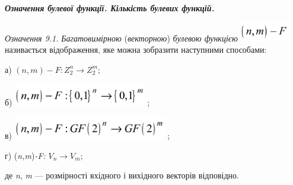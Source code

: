 \bigskip


\bigskip

{\centering\bfseries\itshape
Означення булевої функції.  Кількість булевих функцій. 
\par}


\bigskip


\bigskip

 \textit{Означення 9.1.}\textit{  }\textit{Багатовимірною} (\textit{векторною})
\textit{булевою функцією} 
\includegraphics[width=0.8417in,height=0.3346in]{crypt-img/crypt-img81.png} 
називається відображення, яке можна зобразити наступними способами:

а) ${(n,m)-F:Z_{{2}}^{{n}}\rightarrow Z_{{2}}^{{m}};}$

б)  \includegraphics[width=2.2756in,height=0.3854in]{crypt-img/crypt-img82.png}
;

в)  \includegraphics[width=2.6339in,height=0.3862in]{crypt-img/crypt-img83.png}
; $ $

г)  (\textit{n}\textit{,}\textit{m})\textit{{}-}\textit{F}\textit{:}\textit{ }
${V_{{n}}\rightarrow V_{{m}};}$

де \textit{n}, \textit{m }--- розмірності вхідного і вихідного векторів
відповідно. 

